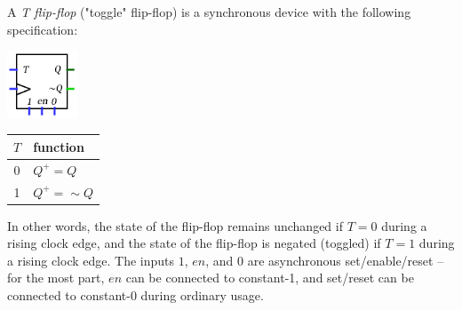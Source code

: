\item [17]

A \textit{T flip-flop} ("toggle" flip-flop) is a synchronous device with the following specification:

\includegraphics[height=2.0cm]{images/T-FF.png}

\begin{tabular}{c | l}
$T$ & function \\
\hline
0 & $Q^{+}=Q$ \\
1 & $Q^{+}=\sim Q$ \\

\end{tabular}

In other words, the state of the flip-flop remains unchanged if $T=0$ during a rising clock edge, and the state of the flip-flop is negated (toggled) if $T=1$ during a rising clock edge. The inputs $1$, $en$, and $0$ are asynchronous set/enable/reset -- for the most part, $en$ can be connected to constant-1, and set/reset can be connected to constant-0 during ordinary usage.

